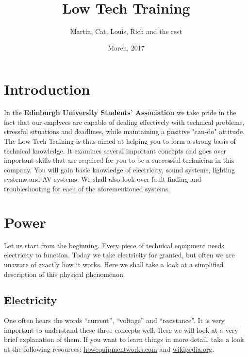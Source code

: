 \documentclass[14pt,twocolumn]{extarticle} %
\title{\huge {\textbf{Low Tech Training}}} %
\author{Martin, Cat, Louis, Rich and the rest}
\date{March, 2017}
\begin{document}

\section{Introduction}
\label{intro}
In the \textbf{Edinburgh University Students' Association} we take pride in the fact that our emplyees are capable of dealing effectively with technical problems, stressful situations and deadlines, while maintaining a positive "can-do" attitude.
The Low Tech Training is thus aimed at helping you to form a strong basis of technical knowledge. It examines several important concepts and goes over important skills that are required for you to be a successful technician in this company. You will gain basic knowledge of electricity, sound systems, lighting systems and AV systems. We shall also look over fault finding and troubleshooting for each of the aforementioned systems.


\section{Power}
\label{power}

Let us start from the beginning. Every piece of technical equipment needs electricity to function. Today we take electricity for granted, but often we are unaware of exactly how it works. Here we shall take a look at a simplified description of this physical phenomenon. 

\subsection{Electricity}
\label{electricity}
One often hears the words “current”, “voltage” and “resistance”. It is very important to understand these three concepts well. Here we will look at a very brief explanation of them. If you want to learn things in more detail, take a look at the following resources: \href{https://www.howequipmentworks.com/electricity_basics/}{howequipmentworks.com} and \href{https://en.wikipedia.org/wiki/Electricity#Electric_charge}{wikipedia.org}.
\end{document}
